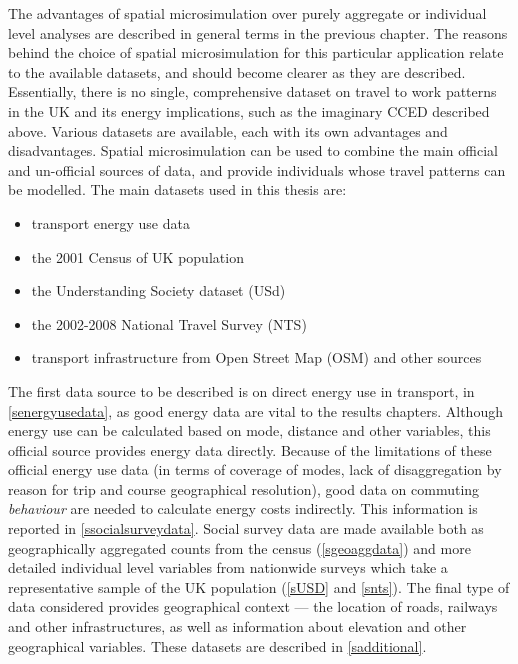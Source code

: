 The advantages of spatial microsimulation over purely aggregate or
individual level analyses are described in general terms in the previous
chapter. The reasons behind the choice of spatial
microsimulation for this particular application relate to the available
datasets, and should become clearer as they are described. Essentially, there is
no single, comprehensive dataset on travel to work patterns in the UK and its
energy implications, such as the imaginary CCED described above. Various
datasets are available, each with its own
advantages and disadvantages. Spatial microsimulation can be used to combine the
main
official and un-official sources of data, and provide individuals whose travel
patterns can be modelled. The main datasets used in this thesis are:
\begin{itemize}
 \item transport energy use data %
 \item the 2001 Census of UK population %
 \item the Understanding Society dataset (USd) %
 \item the 2002-2008 National Travel Survey (NTS) %
 \item transport infrastructure from Open Street Map (OSM) and
other sources %
\end{itemize}
The first data source to be described is on direct energy use in transport,
in \cref{senergyusedata}, as good energy data are vital to
the results chapters. Although energy use can be calculated based on
mode, distance and other variables, this official source provides energy
data directly. Because of the limitations of these official energy use data
(in terms of coverage of modes, lack of disaggregation by reason for trip
and course geographical resolution), good data on commuting
\emph{behaviour} are needed to calculate energy costs indirectly.
This information is reported in \cref{ssocialsurveydata}.
Social survey data are made available both as geographically aggregated
counts from the census (\cref{sgeoaggdata}) and more detailed individual level
variables from  nationwide surveys which take a representative sample of
the UK population (\cref{sUSD} and \cref{snts}). The final type of data
considered
provides geographical context --- the location of roads, railways and other
infrastructures, as well as information about elevation and other
geographical variables. These datasets are described in \cref{sadditional}.

